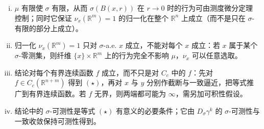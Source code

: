 \documentclass[../../main.tex]{subfiles}%
\begin{document}
\begin{remark}\label{remark:ch01-thm-1-45-条件}
\begin{enumerate}[(i)]
\item $\mu$ 有限使 $\sigma$ 有限，从而 $\sigma(B(x,r))$ 在 $r\to0$ 时的行为可由测度微分定理控制；同时它保证 $\nu_x(\mathbb{R}^m)=1$ 的归一化在整个 $\mathbb{R}^n$ 上成立（而不是只在 $\sigma$-有限的部分上成立）。
\item 归一化 $\nu_x(\mathbb{R}^m)=1$ 只对 $\sigma$-a.e. $x$ 成立，不能对每个 $x$ 成立：若 $x$ 属于某个 $\sigma$-零测集，则纤维 $\{x\}\times\mathbb{R}^m$ 上的行为完全不影响 $\mu$，$\nu_x$ 可以任意选取。
\item 结论对每个有界连续函数 $f$ 成立，而不只是对 $C_c$ 中的 $f$：先对 $f\in C_c(\mathbb{R}^{n+m})$ 得到 $(\star)$，再对 $x$ 与 $y$ 分别作截断与一致逼近，把等式推广到有界连续函数。若 $f$ 无界，则两端都可能为 $\infty$，需另加可积性假设。
\item 结论中的 $\sigma$-可测性是等式 $(\star)$ 有意义的必要条件；它由 $D_\sigma\gamma^k$ 的 $\sigma$-可测性与一致收敛保持可测性得到。
\end{enumerate}
\end{remark}
\end{document}
